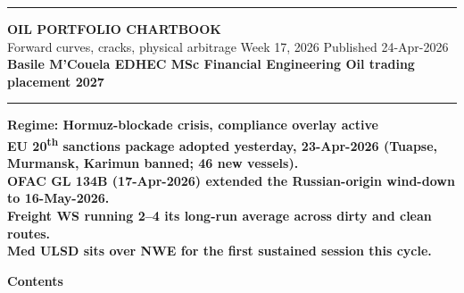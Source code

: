\documentclass[10pt,a4paper]{article}
\begin{document}
\thispagestyle{empty}
\vspace*{0.4cm}
\begin{center}
{\color{obblue}\rule{\linewidth}{2pt}}\vspace{0.5cm}

{\Huge\bfseries\color{obblue} OIL PORTFOLIO CHARTBOOK}\\[0.3cm]

{\large\color{obgrey} Forward curves, cracks, physical arbitrage \textperiodcentered{} Week 17, 2026 \textperiodcentered{} Published 24-Apr-2026}\\[0.2cm]
{\normalsize\bfseries\color{obblue} Basile M'Couela \textperiodcentered{} EDHEC MSc Financial Engineering \textperiodcentered{} Oil trading placement 2027}

\vspace{0.3cm}
{\color{obblue}\rule{\linewidth}{2pt}}
\end{center}

\vspace{0.4cm}
\begin{tcolorbox}[colback=obbg,colframe=obblue,arc=3pt]
\centering\normalsize\bfseries Regime: Hormuz-blockade crisis, compliance overlay active\\[0.15cm]
\normalfont\footnotesize
EU 20\textsuperscript{th} sanctions package adopted yesterday, 23-Apr-2026 (Tuapse, Murmansk, Karimun banned; 46 new vessels).\\
OFAC GL 134B (17-Apr-2026) extended the Russian-origin wind-down to 16-May-2026.\\
Freight WS running 2--4\texttimes{} its long-run average across dirty and clean routes.\\
Med ULSD sits over NWE for the first sustained session this cycle.
\end{tcolorbox}

\vspace{0.5cm}
\begin{center}{\color{obblue}\bfseries\large Contents}\end{center}
\end{document}
